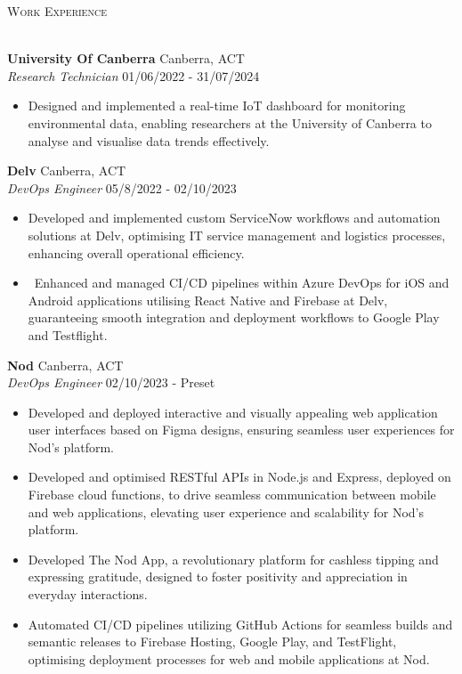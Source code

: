 \documentclass[a4paper]{article}
\newcommand{\lineunder} {
    \vspace*{-8pt} \\
    \hspace*{-18pt} \hrulefill \\
}
\newcommand{\header} [1] {
    {\hspace*{-18pt}\vspace*{6pt} \textsc{#1}}
    \vspace*{-6pt} \lineunder
}
\begin{document}
      \header{Work Experience}
      \vspace{1mm}

      \textbf{University Of Canberra} \hfill Canberra, ACT\\
          \textit{Research Technician} \hfill 01/06/2022 - 31/07/2024\\
          \vspace{-1mm}
\begin{itemize} \itemsep 1pt
      \item Designed and implemented a real-time IoT dashboard for monitoring environmental data, enabling researchers at the University of Canberra to analyse and visualise data trends effectively.
\end{itemize}
      \textbf{Delv} \hfill Canberra, ACT\\
          \textit{DevOps Engineer} \hfill 05/8/2022 - 02/10/2023\\
          \vspace{-1mm}
      \begin{itemize} \itemsep 1pt
            \item Developed and implemented custom ServiceNow workflows and automation solutions at Delv, optimising IT service management and logistics processes, enhancing overall operational efficiency.
            \item {\
}Enhanced and managed CI/CD pipelines within Azure DevOps for iOS and Android applications utilising React Native and Firebase at Delv, guaranteeing smooth integration and deployment workflows to Google Play and Testflight.
      \end{itemize}
      \textbf{Nod} \hfill Canberra, ACT\\
          \textit{DevOps Engineer} \hfill 02/10/2023 - Preset\\
          \vspace{-1mm}
\begin{itemize} \itemsep 1pt
      \item Developed and deployed interactive and visually appealing web application user interfaces based on Figma designs, ensuring seamless user experiences for Nod's platform.
      \item Developed and optimised RESTful APIs in Node.js and Express, deployed on Firebase cloud functions, to drive seamless communication between mobile and web applications, elevating user experience and scalability for Nod's platform.
      \item Developed The Nod App, a revolutionary platform for cashless tipping and expressing gratitude, designed to foster positivity and appreciation in everyday interactions.
      \item Automated CI/CD pipelines utilizing GitHub Actions for seamless builds and semantic releases to Firebase Hosting, Google Play, and TestFlight, optimising deployment processes for web and mobile applications at Nod.
\end{itemize}
\end{document}
